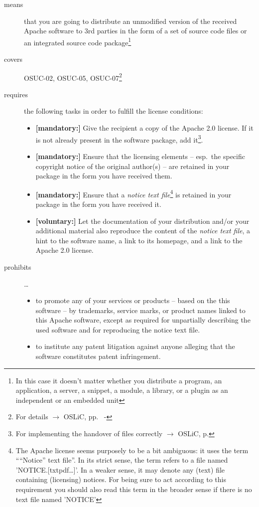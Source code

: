 \begin{description}

\item[means] that you are going to distribute an unmodified version of the
received Apache software to 3rd parties in the form of a set of source code files or
an integrated source code package\footnote{In this case it doesn't matter
whether you  distribute a program, an application, a server, a snippet, a
module, a library, or a plugin as an independent or an embedded unit}

\item[covers] OSUC-02, OSUC-05, OSUC-07\footnote{For details $\rightarrow$ OSLiC, pp.\ 
\pageref{OSUC-02-DEF} - \pageref{OSUC-07-DEF}}

\item[requires] the following tasks in order to fulfill the license conditions:
\begin{itemize}
  \item \textbf{[mandatory:]} Give the recipient a copy of the Apache 2.0
  license. If it is not already present in the software package, add
  it\footnote{For implementing the handover of files correctly $\rightarrow$
  OSLiC, p. \pageref{DistributingFilesHint}}.
  \item \textbf{[mandatory:]} Ensure that the licensing elements -- esp.\ the
  specific copyright notice of the original author(s) -- are retained in your
  package in the form you have received them.
  \item \textbf{[mandatory:]} Ensure that a \emph{notice text file}\footnote{
  The Apache license seems purposely to be a bit ambiguous: it uses the term
  \enquote{``Notice'' text file}. In its strict sense, the term refers to a file
  named 'NOTICE.[txt\textbar{}pdf\textbar{}\ldots]'. In a weaker sense, it may
  denote any (text) file containing (licensing) notices. For being sure to act
  according to this requirement you should also read this term in the broader
  sense if there is no text file named 'NOTICE'} is retained in your package in
  the form you have received it.
  
  \item \textbf{[voluntary:]} Let the documentation of your distribution and/or
  your additional material also reproduce the content of the \emph{notice text
  file}, a hint to the software name, a link to its homepage, and a link to the
  Apache 2.0 license.
\end{itemize}

\item[prohibits] \ldots
\begin{itemize}
  \item to promote any of your services or products – based on the this software
  – by trademarks, service marks, or product names linked to this Apache
  software, except as required for unpartially describing the used software and
  for reproducing the notice text file.
  \item to institute any patent litigation against anyone alleging that the
  software constitutes patent infringement.
\end{itemize}

\end{description}


